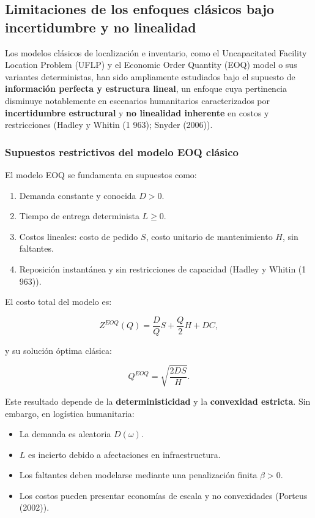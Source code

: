 \documentclass[
  spanish,
  us-letterpaper,
  DIV=11,
  numbers=noendperiod]{scrreprt}
\providecommand{\tightlist}{%
  \setlength{\itemsep}{0pt}\setlength{\parskip}{0pt}}
\numberwithin{equation}{section}
\begin{document}
\subsection{Limitaciones de los enfoques clásicos bajo incertidumbre y
no
linealidad}\label{limitaciones-de-los-enfoques-cluxe1sicos-bajo-incertidumbre-y-no-linealidad}

Los modelos clásicos de localización e inventario, como el Uncapacitated
Facility Location Problem (UFLP) y el Economic Order Quantity (EOQ)
model o sus variantes deterministas, han sido ampliamente estudiados
bajo el supuesto de \textbf{información perfecta y estructura lineal},
un enfoque cuya pertinencia disminuye notablemente en escenarios
humanitarios caracterizados por \textbf{incertidumbre estructural} y
\textbf{no linealidad inherente} en costos y restricciones (Hadley y
Whitin (1 963); Snyder (2006)).

\subsubsection{Supuestos restrictivos del modelo EOQ
clásico}\label{supuestos-restrictivos-del-modelo-eoq-cluxe1sico}

El modelo EOQ se fundamenta en supuestos como:

\begin{enumerate}
\def\labelenumi{\arabic{enumi}.}
\tightlist
\item
  Demanda constante y conocida \(D>0\).
\item
  Tiempo de entrega determinista \(L \geq 0\).
\item
  Costos lineales: costo de pedido \(S\), costo unitario de
  mantenimiento \(H\), sin faltantes.
\item
  Reposición instantánea y sin restricciones de capacidad (Hadley y
  Whitin (1 963)).
\end{enumerate}

El costo total del modelo es:

\[
Z^{EOQ}(Q)=\frac{D}{Q}S+\frac{Q}{2}H+DC,
\]

y su solución óptima clásica:

\[
Q^{EOQ}=\sqrt{\frac{2DS}{H}}.
\]

Este resultado depende de la \textbf{deterministicidad} y la
\textbf{convexidad estricta}. Sin embargo, en logística humanitaria:

\begin{itemize}
\tightlist
\item
  La demanda es aleatoria \(D(\omega)\).
\item
  \(L\) es incierto debido a afectaciones en infraestructura.
\item
  Los faltantes deben modelarse mediante una penalización finita
  \(\beta>0\).
\item
  Los costos pueden presentar economías de escala y no convexidades
  (Porteus (2002)).
\end{itemize}
\end{document}
